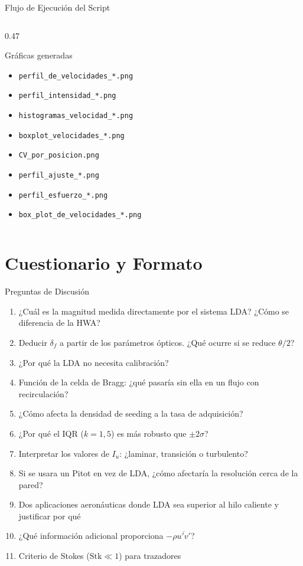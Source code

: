 \documentclass[aspectratio=169,12pt]{beamer}
\begin{document}
\begin{frame}{Flujo de Ejecución del Script}
\begin{columns}
\begin{column}{0.47\textwidth}
\begin{block}{Gráficas generadas}
				\scriptsize
				\begin{itemize}
					\item \texttt{perfil\_de\_velocidades\_*.png}
					\item \texttt{perfil\_intensidad\_*.png}
					\item \texttt{histogramas\_velocidad\_*.png}
					\item \texttt{boxplot\_velocidades\_*.png}
					\item \texttt{CV\_por\_posicion.png}
					\item \texttt{perfil\_ajuste\_*.png}
					\item \texttt{perfil\_esfuerzo\_*.png}
					\item \texttt{box\_plot\_de\_velocidades\_*.png}
				\end{itemize}
			\end{block}
		\end{column}
	\end{columns}
\end{frame}

\section{Cuestionario y Formato}

\begin{frame}{Preguntas de Discusión}
	\begin{enumerate}\small
		\item ¿Cuál es la magnitud medida directamente por el sistema
		      LDA? ¿Cómo se diferencia de la HWA?
		\item Deducir $\delta_f$ a partir de los parámetros ópticos.
		      ¿Qué ocurre si se reduce $\theta/2$?
		\item ¿Por qué la LDA no necesita calibración?
		\item Función de la celda de Bragg: ¿qué pasaría sin ella
		      en un flujo con recirculación?
		\item ¿Cómo afecta la densidad de seeding a la tasa de
		      adquisición?
		\item ¿Por qué el IQR ($k = 1{,}5$) es más robusto que
		      $\pm2\sigma$?
		\item Interpretar los valores de $I_u$: ¿laminar, transición
		      o turbulento?
		\item Si se usara un Pitot en vez de LDA, ¿cómo afectaría
		      la resolución cerca de la pared?
		\item Dos aplicaciones aeronáuticas donde LDA sea superior
		      al hilo caliente y justificar por qué
		\item ¿Qué información adicional proporciona
		      $-\rho\overline{u'v'}$?
		\item Criterio de Stokes ($\mathrm{Stk} \ll 1$) para
		      trazadores
	\end{enumerate}
\end{frame}
\end{document}
